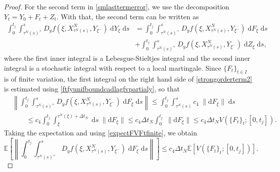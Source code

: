 \documentclass[reqno,12pt]{amsart}
\theoremstyle{plain} %
\theoremstyle{definition} %
\begin{document}
\begin{proof}
    For the second term in \cref{smlasttermerror}, we use the decomposition $Y_t = Y_0 + F_t + Z_t.$ With that, the second term can be written as
    \begin{equation}
        \begin{aligned}
            \label{strongorderterm2}
            \int_0^{t_j} \int_{\tau^N(s)^+}^s D_y f(\xi, X_{\tau^N(s)}^N, Y_{\xi^-}) \;\mathrm{d}Y_\xi \;\mathrm{d}s & = \int_0^{t_j} \int_{\tau^N(s)^+}^s D_y f(\xi, X_{\tau^N(s)}^N, Y_{\xi^-}) \;\mathrm{d}F_\xi \;\mathrm{d}s \\  
            & + \int_0^{t_j} \int_{\tau^N(s)^+}^s D_y f(\xi, X_{\tau^N(s)}^N, Y_{\xi^-}) \;\mathrm{d}Z_\xi \;\mathrm{d}s,
        \end{aligned}
    \end{equation}
    where the first inner integral is a Lebesgue-Stieltjes integral and the second inner integral is a stochastic integral with respect to a local martingale. Since $\{F_t\}_{t\in I}$ is of finite variation, the first integral on the right hand side of \cref{strongorderterm2} is estimated using \cref{ftfyunifboundcadlagfvpartialy}, so that
    \begin{align*}
        & \left\|\int_0^{t_j} \int_{\tau^N(s)^+}^s D_y f(\xi, X_{\tau^N(s)}^N, Y_{\xi^-}) \;\mathrm{d}F_\xi\;\mathrm{d}s\right\| \leq \int_0^{t_j} \int_{\tau^N(s)}^s c_4\;\|\mathrm{d}F_\xi\|\;\mathrm{d}s \\
        & \qquad \leq c_4\int_0^{t_j} \int_{\xi}^{\tau^N(\xi) + \Delta t_N} \;\mathrm{d}s\;\|\mathrm{d}F_\xi\|  \leq c_4\Delta t_N\int_0^{t_j} \;\|\mathrm{d}F_\xi\| \leq c_4\Delta t_N V(\{F_t\}_t; [0, t_j]).
    \end{align*}
    Taking the expectation and using \cref{expectFVFtfinite}, we obtain
    \begin{equation}
        \label{strongorderterm2a}
        \mathbb{E}\left[\left\|\int_0^{t_j} \int_{\tau^N(s)^+}^s D_y f(\xi, X_{\tau^N(s)}^N, Y_{\xi^-}) \;\mathrm{d}F_\xi\;\mathrm{d}s\right\|\right] \leq c_4 \Delta t_N \mathbb{E}\left[ V(\{F_t\}_t; [0, t_j]) \right].
    \end{equation}
    

\end{proof}
\end{document}
